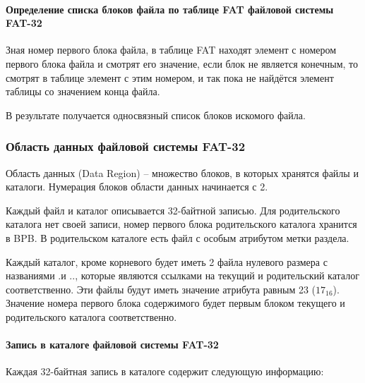 \paragraph{Определение списка блоков файла по таблице FAT файловой системы FAT-32}

Зная номер первого блока файла, в таблице FAT находят элемент с номером первого блока файла и смотрят его значение, если блок не является конечным, то смотрят в таблице элемент с этим номером, и так пока не найдётся элемент таблицы со значением конца файла.

В результате получается односвязный список блоков искомого файла.

\subsubsection{Область данных файловой системы FAT-32}

Область данных (Data Region) -- множество блоков, в которых хранятся файлы и каталоги. Нумерация блоков области данных начинается с 2.

Каждый файл и каталог описывается 32-байтной записью. Для родительского каталога нет своей записи, номер первого блока родительского каталога хранится в BPB. В родительском каталоге есть файл с особым атрибутом метки раздела.

Каждый каталог, кроме корневого будет иметь 2 файла нулевого размера с названиями \textquotedbl.\textquotedbl и \textquotedbl..\textquotedbl, которые являются ссылками на текущий и родительский каталог соответственно. Эти файлы будут иметь значение атрибута равным 23 ($17_{16}$). Значение номера первого блока содержимого будет первым блоком текущего и родительского каталога соответственно.

\paragraph{Запись в каталоге файловой системы FAT-32}

Каждая 32-байтная запись в каталоге содержит следующую информацию:

